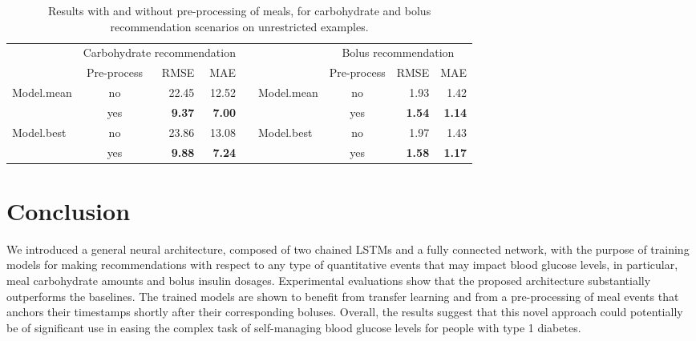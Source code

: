 \documentclass[graybox]{svmult}
\begin{document}
\begin{table}\setlength{\tabcolsep}{4pt}
\caption{Results with and without pre-processing of meals, for carbohydrate and bolus recommendation scenarios on unrestricted examples.}
\begin{center}
\label{tab:preprocess}
\begin{tabular}{|l|c|rr|c|l|c|rr|}

    \cline{2-4} \cline{7-9}
    \multicolumn{1}{c}{} & \multicolumn{3}{|c|}{Carbohydrate recommendation} & \multicolumn{2}{c}{} & \multicolumn{3}{|c|}{Bolus recommendation} \\
    \cline{2-4} \cline{7-9}
	\multicolumn{1}{c|}{} & Pre-process & RMSE & MAE & \multicolumn{2}{c|}{} & Pre-process & RMSE & MAE\\
    \cline{1-4} \cline{6-9}
    \multirow{2}{*}{Model.mean} & no & 22.45 & 12.52 & & \multirow{2}{*}{Model.mean} & no & 1.93 & 1.42\\
	& yes & \textbf{9.37} & \textbf{7.00} & & & yes & \textbf{1.54} & \textbf{1.14}\\
    \cline{1-4} \cline{6-9}
    \multirow{2}{*}{Model.best} & no & 23.86 & 13.08 & & \multirow{2}{*}{Model.best} & no & 1.97 & 1.43 \\
    & yes & {\bf 9.88} & {\bf 7.24} & & & yes & {\bf 1.58} & {\bf 1.17} \\
    \cline{1-4} \cline{6-9}
\end{tabular}
\end{center}
\end{table}



\section{Conclusion}

We introduced a general neural architecture, composed of two chained LSTMs and a fully connected network, with the purpose of training  models for making recommendations with respect to any type of quantitative events that may impact blood glucose levels, in particular, meal carbohydrate amounts and bolus insulin dosages. Experimental evaluations show that the proposed architecture substantially outperforms the baselines. The trained models are shown to benefit from transfer learning and from a pre-processing of meal events that anchors their timestamps shortly after their corresponding boluses. Overall, the results suggest that this novel approach could potentially be of significant use in easing the complex task of self-managing blood glucose levels for people with type 1 diabetes.
\end{document}

